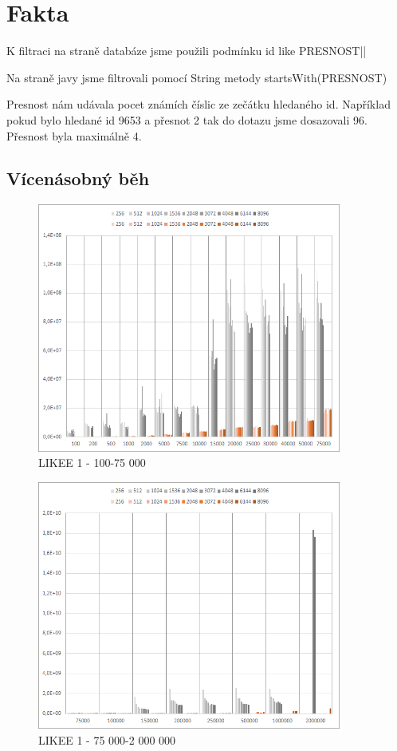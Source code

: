 \documentclass[a4paper, 11pt]{article}
\begin{document}
\section{Fakta}
K filtraci na straně databáze jsme použili podmínku id like PRESNOST||

Na straně javy jsme filtrovali pomocí String metody startsWith(PRESNOST)

Presnost nám udávala pocet známích číslic ze zečátku hledaného id. Například pokud bylo hledané id 9653 a přesnot 2 tak do dotazu jsme dosazovali 96. Přesnost byla maximálně 4.

\subsection{Vícenásobný běh}
\newpage
\begin{figure}[H]
\centering
\includegraphics[width=100mm]{images/n1-100-75k.png}
\caption{LIKEE 1 - 100-75 000}
\end{figure}
\begin{figure}[H]
\centering
\includegraphics[width=100mm]{images/n1-75k-2kk.png}
\caption{LIKEE 1 - 75 000-2 000 000}
\end{figure}
\end{document}
